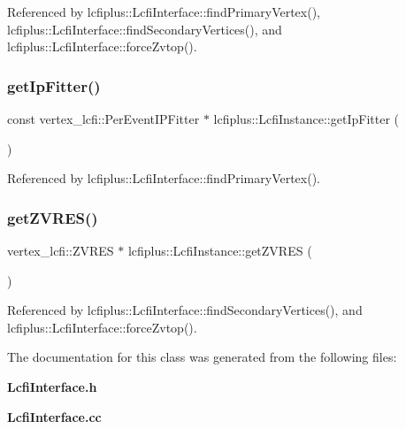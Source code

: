 Referenced by lcfiplus\+::\+Lcfi\+Interface\+::find\+Primary\+Vertex(), lcfiplus\+::\+Lcfi\+Interface\+::find\+Secondary\+Vertices(), and lcfiplus\+::\+Lcfi\+Interface\+::force\+Zvtop().

\mbox{\label{classlcfiplus_1_1LcfiInstance_a757b9ac27b43ce4c42fd7c89d8f6079d}} 
\subsubsection{get\+Ip\+Fitter()}
{\footnotesize\ttfamily const vertex\+\_\+lcfi\+::\+Per\+Event\+I\+P\+Fitter $\ast$ lcfiplus\+::\+Lcfi\+Instance\+::get\+Ip\+Fitter (\begin{DoxyParamCaption}{ }\end{DoxyParamCaption})}



Referenced by lcfiplus\+::\+Lcfi\+Interface\+::find\+Primary\+Vertex().

\mbox{\label{classlcfiplus_1_1LcfiInstance_a42b9321967b9a26e56ebb694551614a6}} 
\subsubsection{get\+Z\+V\+R\+E\+S()}
{\footnotesize\ttfamily vertex\+\_\+lcfi\+::\+Z\+V\+R\+ES $\ast$ lcfiplus\+::\+Lcfi\+Instance\+::get\+Z\+V\+R\+ES (\begin{DoxyParamCaption}{ }\end{DoxyParamCaption})}



Referenced by lcfiplus\+::\+Lcfi\+Interface\+::find\+Secondary\+Vertices(), and lcfiplus\+::\+Lcfi\+Interface\+::force\+Zvtop().



The documentation for this class was generated from the following files\+:\begin{DoxyCompactItemize}
\item 
\textbf{ Lcfi\+Interface.\+h}\item 
\textbf{ Lcfi\+Interface.\+cc}\end{DoxyCompactItemize}
